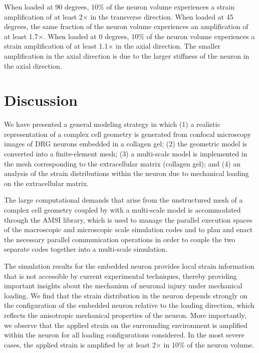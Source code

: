 \documentclass[]{interact}
\begin{document}
When loaded at 90 degrees, 10$\%$ of the neuron volume experiences a strain amplification of at least 2$\times$ in the transverse direction. When loaded at 45 degrees, the same fraction of the neuron volume experiences an amplification of at least 1.7$\times$. When loaded at 0 degrees, 10$\%$ of the neuron volume experiences a strain amplification of at least 1.1$\times$ in the axial direction. The smaller amplification in the axial direction is due to the larger stiffness of the neuron in the axial direction. 

\section{Discussion}
\label{sec:discussion}

We have presented a general modeling strategy in which (1) a realistic representation of a complex cell geometry is generated from confocal microscopy images of DRG neurons embedded in a collagen gel; (2) the geometric model is converted into a finite-element mesh; (3) a multi-scale model is implemented in the mesh corresponding to the extracellular matrix (collagen gel); and (4) an analysis of the strain distributions within the neuron due to mechanical loading on the extracellular matrix.

The large computational demands that arise from the unstructured mesh of a complex cell geometry coupled by with a multi-scale model is accommodated through the AMSI library, which is used to manage the parallel execution spaces of the macroscopic and microscopic scale simulation codes and to plan and enact the necessary parallel communication operations in order to couple the two separate codes together into a multi-scale simulation.

The simulation results for the embedded neuron provides local strain information that is not accessible by current experimental techniques, thereby providing important insights about the mechanism of neuronal injury under mechanical loading. We find that the strain distribution in the neuron depends strongly on the configuration of the embedded neuron relative to the loading direction, which reflects the anisotropic mechanical properties of the neuron. More importantly, we observe that the applied strain on the surrounding environment is amplified within the neuron for all loading configurations considered. In the most severe cases, the applied strain is amplified by at least 2$\times$ in 10$\%$ of the neuron volume. 
\end{document}
